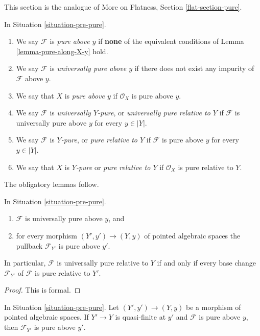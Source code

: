 \noindent
This section is the analogue of
More on Flatness, Section \ref{flat-section-pure}.

\begin{definition}
\label{definition-pure}
In Situation \ref{situation-pre-pure}.
\begin{enumerate}
\item We say $\mathcal{F}$ is {\it pure above $y$} if {\bf none} of the
equivalent conditions of Lemma \ref{lemma-pure-along-X-y} hold.
\item We say $\mathcal{F}$ is {\it universally pure above $y$}
if there does not exist any impurity of $\mathcal{F}$ above $y$.
\item We say that $X$ is {\it pure above $y$} if $\mathcal{O}_X$
is pure above $y$.
\item We say $\mathcal{F}$ is {\it universally $Y$-pure}, or
{\it universally pure relative to $Y$} if $\mathcal{F}$ is universally
pure above $y$ for every $y \in |Y|$.
\item We say $\mathcal{F}$ is {\it $Y$-pure}, or
{\it pure relative to $Y$} if $\mathcal{F}$ is pure above $y$
for every $y \in |Y|$.
\item We say that $X$ is {\it $Y$-pure} or {\it pure relative to $Y$}
if $\mathcal{O}_X$ is pure relative to $Y$.
\end{enumerate}
\end{definition}

\noindent
The obligatory lemmas follow.

\begin{lemma}
\label{lemma-base-change-universally}
In Situation \ref{situation-pre-pure}.
\begin{enumerate}
\item $\mathcal{F}$ is universally pure above $y$, and
\item for every morphism $(Y', y') \to (Y, y)$ of pointed algebraic spaces
the pullback $\mathcal{F}_{Y'}$ is pure above $y'$.
\end{enumerate}
In particular, $\mathcal{F}$ is universally pure relative to $Y$ if and
only if every base change $\mathcal{F}_{Y'}$ of $\mathcal{F}$ is
pure relative to $Y'$.
\end{lemma}

\begin{proof}
This is formal.
\end{proof}

\begin{lemma}
\label{lemma-quasi-finite-base-change}
In Situation \ref{situation-pre-pure}.
Let $(Y', y') \to (Y, y)$ be a morphism of pointed algebraic spaces.
If $Y' \to Y$ is quasi-finite at $y'$ and $\mathcal{F}$ is pure above $y$,
then $\mathcal{F}_{Y'}$ is pure above $y'$.
\end{lemma}

